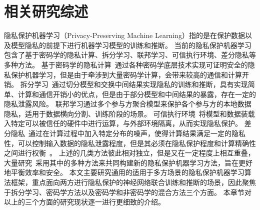 \chapter{相关研究综述}
隐私保护机器学习（Privacy-Preserving Machine Learning）指的是在保护数据以及模型隐私的前提下进行机器学习模型的训练和推断。
%
当前的隐私保护机器学习包含了基于密码学的隐私计算、拆分学习、联邦学习、可信执行环境、差分隐私等多种方法。
%
基于密码学的隐私计算~\cite{al_2019_ppml}通过各种密码学底层技术实现可证明安全的隐私保护机器学习，但是由于牵涉到大量密码学计算，会带来较高的通信和计算开销。
%
拆分学习~\cite{vepakomma2018split}通过切分模型和交换中间结果实现隐私的训练和推断，具有实现简单、计算和通信开销小的优点，但是由于部分模型和中间结果的暴露，存在一定的隐私泄露风险。
%
联邦学习\cite{yangqiang2019federated,mcmahan_2017_fedavg}通过多个参与方聚合模型来保护各个参与方的本地数据隐私，适用于数据横向分割、训练阶段的场景。
%
可信执行环境~\cite{sabt_2015_tee,2016_intel_sgx}将模型和数据装载入特定可以被信任的硬件中进行运算，与外部环境隔离，从而实现隐私保护。
%
差分隐私~\cite{dwork_2006_differential_privacy,wuruihan_2023_label_dp}通过在计算过程中加入特定分布的噪声，使得计算结果满足一定的隐私性，可以控制输入数据的隐私泄露程度，但是其必须在隐私保护程度和计算精确性之间进行权衡~\cite{abadi_2016_dp_dl}。
%
上述的几类方法彼此相对独立，但是又在一定程度上相互重叠，大量研究~\cite{zhangqiao_2018_gelu_net,bonawitz_2017_secure_agg,thapa_2022_splitfed,zhou_2022_codesign,riazi_2018_chameleon,weikang_2020_fed_dp}采用其中的多种方法来共同构建新的隐私保护机器学习方法，旨在更好地平衡效率和安全。
%
本文主要研究通用的适用于多方场景的隐私保护机器学习算法框架，重点面向两方进行隐私保护的神经网络联合训练和推断的场景，因此聚焦于拆分学习、密码学方法以及密码学和非密码学的混合方法三个方面。
%
本章节对以上的三个方面的研究现状逐一进行更细致的介绍。




